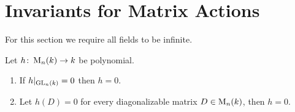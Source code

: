 \section{Invariants for Matrix Actions}


\begin{fluff}
  For this section we require all fields to be infinite.
\end{fluff}


\begin{proposition}
  Let $h \colon \operatorname{M}_n(k) \to k$ be polynomial.
  \begin{enumerate}
    \item
      If $h|_{\operatorname{GL}_n(k)} = 0$ then $h = 0$.
    \item
      Let $h(D) = 0$ for every diagonalizable matrix $D \in \operatorname{M}_n(k)$, then $h = 0$.
  \end{enumerate}
\end{proposition}



